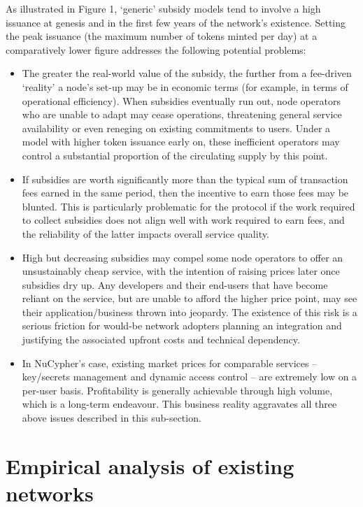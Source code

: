 \documentclass[8pt]{article}
\begin{document}
As illustrated in Figure 1, `generic' subsidy models tend to involve a high issuance at genesis and in the first few years of the network's existence. Setting the peak issuance (the maximum number of tokens minted per day) at a comparatively lower figure addresses the following potential problems: 
\begin{itemize}
\item The greater the real-world value of the subsidy, the further from a fee-driven `reality' a node's set-up may be in economic terms (for example, in terms of operational efficiency). When subsidies eventually run out, node operators who are unable to adapt may cease operations, threatening general service availability or even reneging on existing commitments to users. Under a model with higher token issuance early on, these inefficient operators may control a substantial proportion of the circulating supply by this point. 
\item If subsidies are worth significantly more than the typical sum of transaction fees earned in the same period, then the incentive to earn those fees may be blunted. This is particularly problematic for the protocol if the work required to collect subsidies does not align well with work required to earn fees, and the reliability of the latter impacts overall service quality. 
\item High but decreasing subsidies may compel some node operators to offer an unsustainably cheap service, with the intention of raising prices later once subsidies dry up. Any developers and their end-users that have become reliant on the service, but are unable to afford the higher price point, may see their application/business thrown into jeopardy. The existence of this risk is a serious friction for would-be network adopters planning an integration and justifying the associated upfront costs and technical dependency.
\item In NuCypher's case, existing market prices for comparable services – key/secrets management and dynamic access control – are extremely low on a per-user basis. Profitability is generally achievable through high volume, which is a long-term endeavour. This business reality aggravates all three above issues described in this sub-section.
\end{itemize}

\section{Empirical analysis of existing networks}
\end{document}
